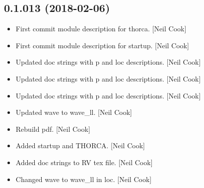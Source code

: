 \documentclass[a4paper,10pt,english]{report}
\begin{document}
\subsection{0.1.013 (2018-02-06)}
\label{\detokenize{misc/changelog:id489}}\begin{itemize}
\item {} 
First commit module description for thorca. {[}Neil Cook{]}

\item {} 
First commit module description for startup. {[}Neil Cook{]}

\item {} 
Updated doc strings with p and loc descriptions. {[}Neil Cook{]}

\item {} 
Updated doc strings with p and loc descriptions. {[}Neil Cook{]}

\item {} 
Updated doc strings with p and loc descriptions. {[}Neil Cook{]}

\item {} 
Updated wave to wave\_ll. {[}Neil Cook{]}

\item {} 
Rebuild pdf. {[}Neil Cook{]}

\item {} 
Added startup and THORCA. {[}Neil Cook{]}

\item {} 
Added doc strings to RV tex file. {[}Neil Cook{]}

\item {} 
Changed wave to wave\_ll in loc. {[}Neil Cook{]}

\end{itemize}
\end{document}
